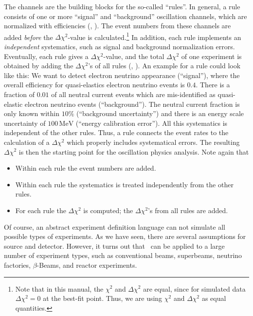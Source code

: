 The channels are the building blocks for the so-called ``rules''.
 In general, a rule consists of one or more ``signal'' and ``background'' oscillation channels, which are normalized with efficiencies
(\cf, ). The event numbers from these channels are added {\em before} the $\Delta \chi^2$-value is calculated.\footnote{Note that
in this manual, the $\chi^2$ and $\Delta \chi^2$ are equal, since
for simulated data $\Delta \chi^2 = 0$ at the best-fit point. Thus, we
are using $\chi^2$ and $\Delta \chi^2$ as equal quantities.} In addition, each rule implements an {\em independent} systematics, such as signal and background normalization errors. Eventually, each rule gives a $\Delta \chi^2$-value, and the total $\Delta \chi^2$ of one experiment is obtained by adding the $\Delta \chi^2$'s of all rules (\cf, ). 
 An example for a rule could look like this: We want to detect electron
  neutrino appearance (``signal''), where the overall efficiency for 
  quasi-elastics electron neutrino events is $0.4$. There is a fraction of 
  $0.01$ of all neutral current events which are mis-identified as 
  quasi-elastic electron neutrino events (``background''). The neutral 
  current fraction is only known within $10\%$ (``background uncertainty'') 
  and there is
an energy scale uncertainty of $100\,\mathrm{MeV}$ (``energy calibration error'').
All this systematics is independent of the other rules.  Thus, a rule connects the event rates to the calculation of a $\Delta \chi^2$ which properly includes systematical errors. The resulting $\Delta \chi^2$ is then the starting point for the oscillation physics analysis. Note again that
\begin{itemize}
\item
 Within each rule the event numbers are added.
\item
 Within each rule the systematics is treated independently from the other rules.
\item
 For each rule the $\Delta \chi^2$ is computed; the $\Delta \chi^2$'s from all rules are added.
\end{itemize}

Of course, an abstract experiment definition language can not simulate all possible types of experiments. As we have seen, there are several assumptions for source and detector. However, it turns out that \GLOBES\ can be applied to a large number of experiment types, such as conventional beams, superbeams, neutrino factories, $\beta$-Beams, and reactor experiments.

